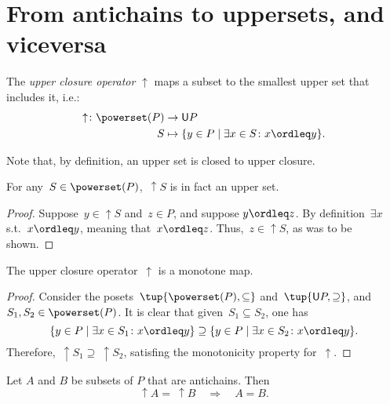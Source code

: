 \section{From antichains to uppersets, and viceversa}
\begin{definition}
    \label{def:upperclosure}
    The \emph{upper closure operator} $\uparrow$ maps a subset to the smallest upper set that includes it, i.e.:
    \begin{equation}
        \begin{aligned}
            \uparrow \colon \powerset(P)&\to \mathsf{U}P\\
            S&\mapsto \{y\in P \mid \exists x\in S \colon x\ordleq y\}.
        \end{aligned}
    \end{equation}
\end{definition}
\begin{remark}
    Note that, by definition, an upper set is closed to upper closure.
\end{remark}
\begin{remark}
    For any~$S\in \powerset(P)$,~$\uparrow S$ is in fact an upper set.
    \begin{proof}
        Suppose~$y\in \uparrow S$ and~$z\in P$, and suppose $y\ordleq z$. By definition~$\exists x$ s.t.~$x\ordleq y$, meaning that~$x\ordleq z$. Thus,~$z\in \uparrow S$, as was to be shown.
    \end{proof}
\end{remark}

\begin{lemma}
    The upper closure operator~$\uparrow$ is a monotone map.
\end{lemma}
\begin{proof}
    Consider the posets~$\tup{\powerset(P),\subseteq}$ and~$\tup{\mathsf{U}P,\supseteq}$, and~$S_1,S_2\in \powerset(P)$. It is clear that given~$S_1\subseteq S_2$, one has
    \begin{equation}
        \{y\in P\mid \exists x\in S_1\colon x\ordleq y\} \supseteq \{y\in P\mid \exists x\in S_2\colon x\ordleq y\}.
    \end{equation}
    Therefore,~$\uparrow S_1\supseteq \ \uparrow S_2$, satisfing the monotonicity property for~$\uparrow$.
\end{proof}

\begin{lemma}
    \label{up-cl-inj-antichains}
    Let $A$ and $B$ be subsets of $P$ that are antichains. Then
    \begin{equation}
        \uparrow A = \ \uparrow B \quad \Rightarrow \quad A = B.
    \end{equation}
\end{lemma}

